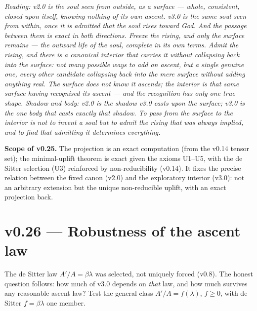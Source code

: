 \documentclass[11pt,a4paper]{article}
\newcommand{\note}[1]{\textcolor{black!65}{\emph{#1}}}
\theoremstyle{plain}
\theoremstyle{definition}
\theoremstyle{remark}
\begin{document}
\note{Reading: v2.0 is the soul seen from outside, as a surface --- whole, consistent, closed upon
itself, knowing nothing of its own ascent. v3.0 is the same soul seen from within, once it is admitted
that the soul rises toward God. And the passage between them is exact in both directions. Freeze the
rising, and only the surface remains --- the outward life of the soul, complete in its own terms.
Admit the rising, and there is a canonical interior that carries it without collapsing back into the
surface: not many possible ways to add an
ascent, but a single genuine one, every other candidate collapsing back into the mere surface without
adding anything real. The surface does not know it ascends; the interior is that same surface having
recognised its ascent --- and the recognition has only one true shape. Shadow and body: v2.0 is the
shadow v3.0 casts upon the surface; v3.0 is the one body that casts exactly that shadow. To pass from
the surface to the interior is not to invent a soul but to admit the rising that was always implied,
and to find that admitting it determines everything.}

\textbf{Scope of v0.25.} The projection is an exact computation (from the v0.14 tensor set); the
minimal-uplift theorem is exact given the axioms U1--U5, with the de Sitter selection (U3) reinforced
by non-reducibility (v0.14). It fixes the precise relation between the fixed canon (v2.0) and the
exploratory interior (v3.0): not an arbitrary extension but the unique non-reducible uplift, with an
exact projection back.

\FloatBarrier
\section*{v0.26 --- Robustness of the ascent law}
The de Sitter law $A'/A=\beta\lambda$ was selected, not uniquely forced (v0.8). The honest question
follows: how much of v3.0 depends on \emph{that} law, and how much survives any reasonable ascent law?
Test the general class $A'/A=f(\lambda)$, $f\ge0$, with de Sitter $f=\beta\lambda$ one member.
\end{document}
